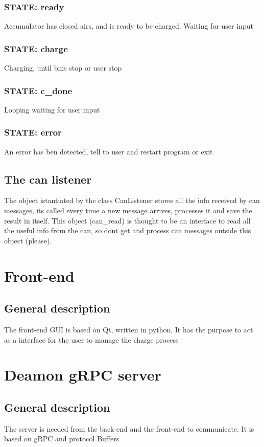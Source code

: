 \documentclass[a4paper]{report}
\begin{document}
  \subsection{STATE: ready}
  Accumulator has closed airs, and is ready to be charged. Waiting for user input
  \subsection{STATE: charge}
  Charging, until bms stop or user stop
  \subsection{STATE: c\_done}
  Looping waiting for user input
  \subsection{STATE: error}
  An error has ben detected, tell to user and restart program or exit

  \section{The can listener}
  The object istantiated by the class CanListener stores all the info received by can messages, its called every time a new message arrives, processes it and save the result in itself. This object (can\_read) is thought to be an interface to read all the useful info from the can, so dont get and process can messages outside this object (please).

  \chapter{Front-end}
  \section{General description}
  The front-end GUI is based on Qt, written in python. It has the purpose to act as a interface for the user to manage the charge process

  \chapter{Deamon gRPC server}
  \section{General description}
  The server is needed from the back-end and the front-end to communicate. It is based on gRPC and protocol Buffers
\end{document}
